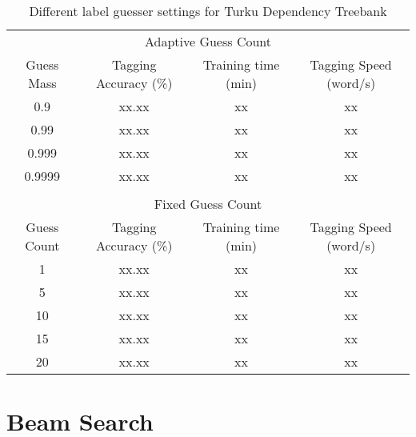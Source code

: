 \begin{table}[htb!]
\begin{center}
\begin{tabular}{cccc}
\multicolumn{4}{c}{Adaptive Guess Count}\\
Guess Mass & Tagging Accuracy (\%) & Training time (min) & Tagging Speed (word/s)\\
\hline
0.9        & xx.xx            & xx            & xx            \\
0.99       & xx.xx            & xx            & xx            \\
0.999      & xx.xx            & xx            & xx            \\
0.9999     & xx.xx            & xx            & xx            \\
\hline
           &                  &               &               \\
\multicolumn{4}{c}{Fixed Guess Count}\\
Guess Count & Tagging Accuracy (\%) & Training time (min) & Tagging Speed (word/s) \\
\hline
1        & xx.xx            & xx            & xx            \\
5        & xx.xx            & xx            & xx            \\
10       & xx.xx            & xx            & xx            \\
15       & xx.xx            & xx            & xx            \\
20       & xx.xx            & xx            & xx            \\
\end{tabular}
\caption{Different label guesser settings for Turku Dependency Treebank}
\end{center}
\end{table}

\section{Beam Search}

